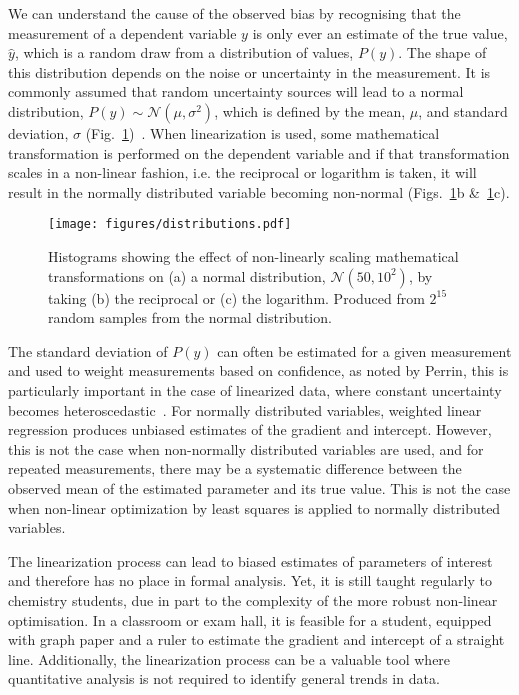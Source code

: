 \documentclass[journal=jceda8,manuscript=article]{achemso}
\begin{document}
We can understand the cause of the observed bias by recognising that the measurement of a dependent variable $y$ is only ever an estimate of the true value, $\hat{y}$, which is a random draw from a distribution of values, $P(y)$. 
The shape of this distribution depends on the noise or uncertainty in the measurement. 
It is commonly assumed that random uncertainty sources will lead to a normal distribution, $P(y) \sim \mathcal{N}(\mu, \sigma^2)$, which is defined by the mean, $\mu$, and standard deviation, $\sigma$ (Fig.~\ref{fig:distributions})~\cite{monk_math_2010}.
When linearization is used, some mathematical transformation is performed on the dependent variable and if that transformation scales in a non-linear fashion, i.e. the reciprocal or logarithm is taken, it will result in the normally distributed variable becoming non-normal (Figs.~\ref{fig:distributions}b \&~\ref{fig:distributions}c).
%
\begin{figure}
  \texttt{[image: figures/distributions.pdf]}
  \caption{
    Histograms showing the effect of non-linearly scaling mathematical transformations on (a) a normal distribution, $\mathcal{N}(50, 10^2)$, by taking (b) the reciprocal or (c) the logarithm. 
    Produced from $2^{15}$ random samples from the normal distribution.
    }
  \label{fig:distributions}
\end{figure}
%

The standard deviation of $P(y)$ can often be estimated for a given measurement and used to weight measurements based on confidence, as noted by Perrin, this is particularly important in the case of linearized data, where constant uncertainty becomes heteroscedastic~\cite{perrin_linear_2017}.
For normally distributed variables, weighted linear regression produces unbiased estimates of the gradient and intercept. 
However, this is not the case when non-normally distributed variables are used, and for repeated measurements, there may be a systematic difference between the observed mean of the estimated parameter and its true value.
This is not the case when non-linear optimization by least squares is applied to normally distributed variables. 

The linearization process can lead to biased estimates of parameters of interest and therefore has no place in formal analysis. 
Yet, it is still taught regularly to chemistry students, due in part to the complexity of the more robust non-linear optimisation. 
In a classroom or exam hall, it is feasible for a student, equipped with graph paper and a ruler to estimate the gradient and intercept of a straight line. 
Additionally, the linearization process can be a valuable tool where quantitative analysis is not required to identify general trends in data. 
\end{document}
